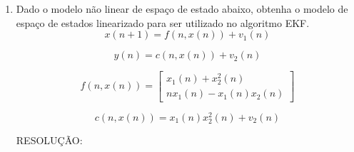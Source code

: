 \documentclass[a4paper,oneside,12pt]{article}
\begin{document}
\begin{enumerate}[1.]
onde $k$ \'e um passo de itera\c{c}\~ao.

Para garantir a estabilidade da rede, segue-se o algoritmo:

\begin{enumerate}[1)]
\item Especificar a matriz de pesos $W$ e o vetor de limiares $i^b$;

\item Apresentar vetor inicial de entradas ($ x^{(0)} $);

\item $v^{atual} \gets x^{(0)}$;

\item Repetir as instru\c{c}\~oes:

$v^{anterior} \gets v^{atua}$;

$u \gets W \cdot v^{anterior} + i ^{b}$;

$v^{atual} \gets g(u)$;

At\'e que: $v^{atual} \cong v^{anterior}$

\item $v^{final} \gets v^{atual}$ ($v^{final}$ representa um ponto de equil\'ibrio)

\end{enumerate}

\item Dado o modelo n\~ao linear de espa\c{c}o de estado abaixo, obtenha o modelo de espa\c{c}o de estados linearizado para ser utilizado no algoritmo EKF. \\

\begin{equation*}
x(n+1) = f(n, x(n)) + v_{1}(n)
\end{equation*}

\begin{equation*}
y(n) = c(n, x(n)) + v_{2}(n)
\end{equation*}

\begin{equation*}
f(n, x(n)) = \begin{bmatrix}
x_{1}(n) + x_{2}^{2}(n) \\
nx_{1}(n) - x_{1}(n)x_{2}(n)
\end{bmatrix}
\end{equation*}

\begin{equation*}
c(n, x(n)) = x_{1}(n)x_{2}^{2}(n) + v_{2}(n)
\end{equation*}

RESOLU\c{C}\~AO: \\


\end{enumerate}
\end{document}
